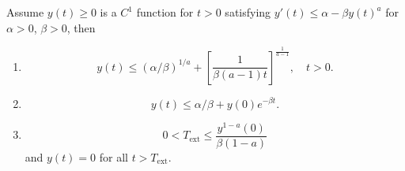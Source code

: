 \begin{exercise}
\label{applied:2013:2}

Assume $y(t)\geq 0$ is a $C^{1}$ function for $t>0$ satisfying $y'(t)\leq\alpha-\beta y(t)^{a}$ for $\alpha>0$, $\beta>0$, then

\begin{enumerate}
\item[(a)] %
\[
y(t)\leq(\alpha/\beta)^{1/a}+\left[\frac{1}{\beta(a-1)t}\right]^{\frac{1}{a-1}},\quad t>0.
\]
\item[(b)] %
\[
y(t)\leq\alpha/\beta+y(0)e^{-\beta t}.
\]
\item[(c)] %
\[
0<T_{\mathrm{ext}}\leq\frac{y^{1-a}(0)}{\beta(1-a)}
\]
and $y(t)=0$ for all $t>T_{\mathrm{ext}}$.
\end{enumerate}
\end{exercise}

